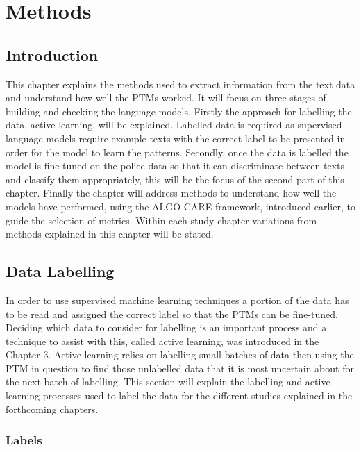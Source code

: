 \chapter{Methods}

\section{Introduction}
This chapter  explains the methods used to extract information from the text data and understand how well the PTMs worked.  It will focus on three stages of  building and checking the language models. Firstly the approach for labelling the data, active learning, will be explained. Labelled data is required as supervised language models require example texts with the correct label to be presented  in order for the model to learn the patterns. Secondly, once the data is labelled the model is fine-tuned on the police data so that it can discriminate between texts and classify them appropriately, this will be the focus of the second part of this chapter. Finally the chapter will address methods to understand how well the models have performed, using the ALGO-CARE framework, introduced earlier, to guide the selection of metrics. Within each study chapter variations from methods explained in this chapter will be stated. 

\section{Data Labelling} In order to use supervised machine learning techniques a portion of the data has to be read and assigned the correct label so that the PTMs can be fine-tuned. Deciding which data to consider for labelling is an important process and a technique to assist with this,  called active learning, was introduced in the Chapter 3. Active learning relies on labelling small batches of data then using the PTM in question to find those unlabelled data that it is most uncertain about for the next batch of labelling. This section will explain the labelling and active learning processes used to label the data for the different studies explained in the forthcoming chapters.

\subsection{Labels}

